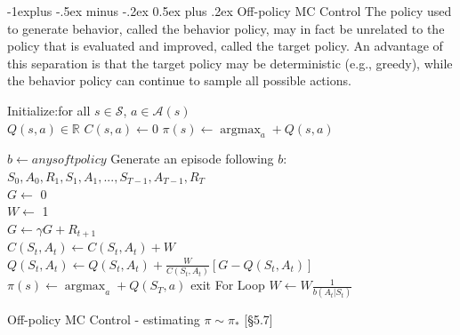 \documentclass[10pt,landscape]{article}
\makeatletter
\renewcommand{\subsection}{\@startsection{subsection}{2}{0mm}%
                                {-1explus -.5ex minus -.2ex}%
                                {0.5ex plus .2ex}%
                                {\normalfont\normalsize\bfseries}}
\DeclareMathOperator*{\argmax}{argmax}
\makeatother
\begin{document}
\begin{multicols}{3}
\subsection{Off-policy MC Control}
The policy used to generate behavior, called the behavior policy, may in fact be unrelated to the policy that is evaluated and improved, called the target policy. An advantage of this separation is that the target policy may be deterministic (e.g., greedy), while the behavior policy can continue to sample all possible actions.
\begin{algorithm}[H]
Initialize:for all $s \in \mathcal{S}$, $a \in \mathcal{A}(s)$ \\
	$Q(s, a) \in \mathbb{R}$ 
 	$C(s,a) \leftarrow 0$
 	$\pi(s) \leftarrow \argmax_a +Q(s,a)$

{
	$b \leftarrow any soft policy$
    	Generate an episode following $b$: $S_0, A_0, R_1, S_1, A_1,..., S_{T-1}, A_{T-1}, R_T$\\
    	$G \leftarrow$ 0 \\
    	$W \leftarrow$ 1 \\
    	{
    		$G \leftarrow \gamma G + R_{t+1}$ \\
    		$C(S_t,A_t) \leftarrow C(S_t,A_t) + W$ \\
    		$Q(S_t,A_t) \leftarrow Q(S_t,A_t) + \frac{W}{C(S_t,A_t)}[G - Q(S_t,A_t)]$ \\
    		$\pi(s) \leftarrow \argmax_a +Q(S_T,a)$
        	{
        		exit For Loop
		}
		$W \leftarrow W \frac{1}{b(A_t|S_t)}$
    }
 }
\caption{Off-policy MC Control - estimating $\pi \sim \pi_*$ [§5.7]}
\end{algorithm}

\end{multicols}

\newpage
\end{document}
